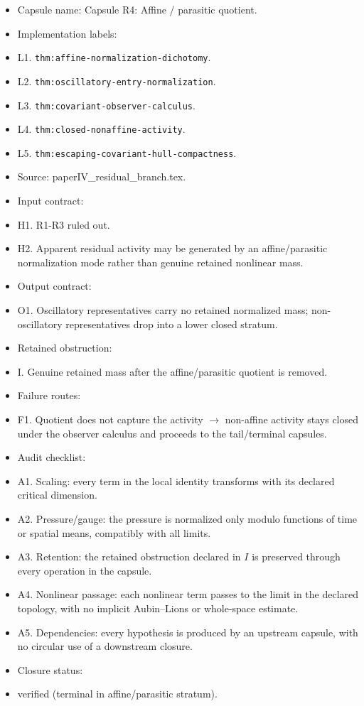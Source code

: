 \documentclass[11pt]{amsart}
\begin{document}
\begin{itemize}
  \item Capsule name: Capsule R4: Affine / parasitic quotient.
  \item Implementation labels:
  \item L1. \texttt{thm:affine-normalization-dichotomy}.
  \item L2. \texttt{thm:oscillatory-entry-normalization}.
  \item L3. \texttt{thm:covariant-observer-calculus}.
  \item L4. \texttt{thm:closed-nonaffine-activity}.
  \item L5. \texttt{thm:escaping-covariant-hull-compactness}.
  \item Source: paperIV\_residual\_branch.tex.
  \item Input contract:
  \item H1. R1-R3 ruled out.
  \item H2. Apparent residual activity may be generated by an affine/parasitic normalization mode rather than genuine retained nonlinear mass.
  \item Output contract:
  \item O1. Oscillatory representatives carry no retained normalized mass; non- oscillatory representatives drop into a lower closed stratum.
  \item Retained obstruction:
  \item I. Genuine retained mass after the affine/parasitic quotient is removed.
  \item Failure routes:
  \item F1. Quotient does not capture the activity $\to$ non-affine activity stays closed under the observer calculus and proceeds to the tail/terminal capsules.
  \item Audit checklist:
  \item A1. Scaling: every term in the local identity transforms with its declared critical dimension.
  \item A2. Pressure/gauge: the pressure is normalized only modulo functions of time or spatial means, compatibly with all limits.
  \item A3. Retention: the retained obstruction declared in $I$ is preserved through every operation in the capsule.
  \item A4. Nonlinear passage: each nonlinear term passes to the limit in the declared topology, with no implicit Aubin--Lions or whole-space estimate.
  \item A5. Dependencies: every hypothesis is produced by an upstream capsule, with no circular use of a downstream closure.
  \item Closure status:
  \item verified (terminal in affine/parasitic stratum).
\end{itemize}
\end{document}
